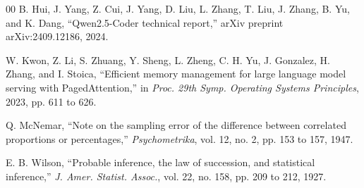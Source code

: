 \documentclass[conference]{IEEEtran}
\begin{document}
\begin{thebibliography}{00}
B. Hui, J. Yang, Z. Cui, J. Yang, D. Liu, L. Zhang, T. Liu, J. Zhang, B. Yu, and
K. Dang, ``Qwen2.5-Coder technical report,'' arXiv preprint arXiv:2409.12186, 2024.

W. Kwon, Z. Li, S. Zhuang, Y. Sheng, L. Zheng, C. H. Yu, J. Gonzalez, H. Zhang, and
I. Stoica, ``Efficient memory management for large language model serving with
PagedAttention,'' in \emph{Proc. 29th Symp. Operating Systems Principles}, 2023,
pp. 611 to 626.

Q. McNemar, ``Note on the sampling error of the difference between correlated
proportions or percentages,'' \emph{Psychometrika}, vol. 12, no. 2, pp. 153 to 157,
1947.

E. B. Wilson, ``Probable inference, the law of succession, and statistical
inference,'' \emph{J. Amer. Statist. Assoc.}, vol. 22, no. 158, pp. 209 to 212,
1927.

\end{thebibliography}
\end{document}
